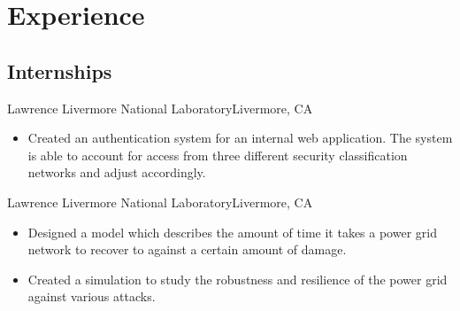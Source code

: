 \documentclass[12pt,a4paper,roman]{moderncv}        %
\begin{document}

\vspace{2pt}


\vspace{2pt}


\section{Experience}



\vspace{5pt}

\subsection{Internships}

{Lawrence Livermore National Laboratory}{Livermore, CA}{}{}

\begin{itemize}
	\item Created an authentication system for an internal web application. The system is able to account for access from three different security classification networks and adjust accordingly. 
\end{itemize}

\vspace{5pt}

{Lawrence Livermore National Laboratory}{Livermore, CA}{}{}

\begin{itemize}
    \item Designed a model which describes the amount of time it takes a power grid network to recover to against a certain amount of damage.

	\item Created a simulation to study the robustness and resilience of the power grid against various attacks.
\end{itemize}
\end{document}
